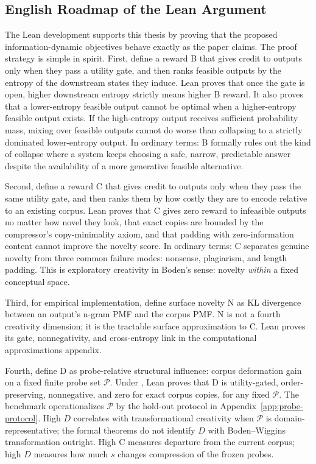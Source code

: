 \documentclass[11pt]{article}
\theoremstyle{remark}
\newcommand{\LeanName}[1]{\texttt{\detokenize{#1}}}
\begin{document}
\subsection*{English Roadmap of the Lean Argument}

The Lean development supports this thesis by proving that the proposed
information-dynamic objectives behave exactly as the paper claims. The proof
strategy is simple in spirit. First, define a reward B that gives credit to
outputs only when they pass a utility gate, and then ranks feasible outputs by
the entropy of the downstream states they induce. Lean proves that once the
gate is open, higher downstream entropy strictly means higher B reward. It also
proves that a lower-entropy feasible output cannot be optimal when a
higher-entropy feasible output exists. If the high-entropy output receives
sufficient probability mass, mixing over feasible outputs cannot do worse than
collapsing to a strictly dominated lower-entropy output. In ordinary terms: B
formally rules out the kind of collapse where a system keeps choosing a safe,
narrow, predictable answer despite the availability of a more generative
feasible alternative.

Second, define a reward C that gives credit to outputs only when they pass the
same utility gate, and then ranks them by how costly they are to encode relative
to an existing corpus. Lean proves that C gives zero reward to infeasible
outputs no matter how novel they look, that exact copies are bounded by the
compressor's copy-minimality axiom, and that padding with zero-information
content cannot improve the novelty score. In ordinary terms: C separates
genuine novelty from three common failure modes: nonsense, plagiarism, and
length padding. This is exploratory creativity in Boden's sense: novelty
\emph{within} a fixed conceptual space.

Third, for empirical implementation, define surface novelty N as KL divergence
between an output's n-gram PMF and the corpus PMF. N is not a fourth creativity
dimension; it is the tractable surface approximation to C. Lean proves its gate,
nonnegativity, and cross-entropy link in the computational approximations
appendix.

Fourth, define D as probe-relative structural influence: corpus deformation gain
on a fixed finite probe set $\mathcal{P}$. Under \LeanName{ProbeCompressor}, Lean
proves that D is utility-gated, order-preserving, nonnegative, and zero for exact
corpus copies, for any fixed $\mathcal{P}$. The benchmark operationalizes
$\mathcal{P}$ by the hold-out protocol in Appendix~\ref{app:probe-protocol}.
High $D$ correlates with transformational creativity when $\mathcal{P}$ is
domain-representative; the formal theorems do not identify $D$ with Boden--Wiggins
transformation outright. High C measures departure from the current corpus; high
$D$ measures how much $s$ changes compression of the frozen probes.
\end{document}
